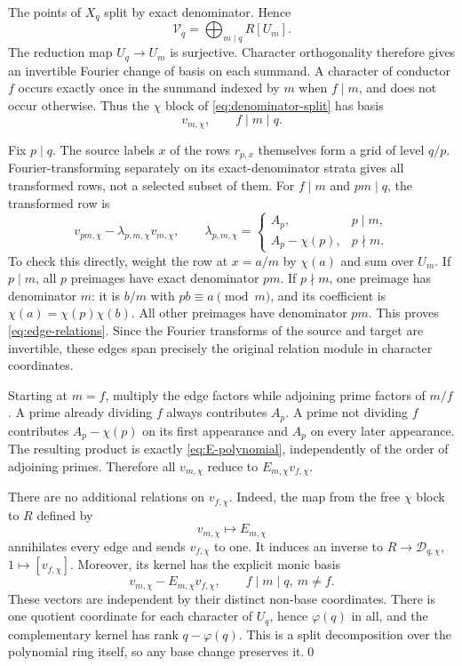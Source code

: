 \documentclass[11pt]{article}
\numberwithin{equation}{section}
\theoremstyle{definition}
\theoremstyle{remark}
\newcommand{\V}{\mathcal V}
\newcommand{\D}{\mathcal D}
\begin{document}
The points of $X_q$ split by exact denominator. Hence
\begin{equation}\label{eq:denominator-split}
 \V_q=\bigoplus_{m\mid q}R[U_m].
\end{equation}
The reduction map $U_q\to U_m$ is surjective. Character orthogonality
therefore gives an invertible Fourier change of basis on each summand.
A character of conductor $f$ occurs exactly once in the summand indexed
by $m$ when $f\mid m$, and does not occur otherwise. Thus the $\chi$
block of \eqref{eq:denominator-split} has basis
\[
 v_{m,\chi},\qquad f\mid m\mid q.
\]

Fix $p\mid q$. The source labels $x$ of the rows $r_{p,x}$ themselves
form a grid of level $q/p$. Fourier-transforming separately on its
exact-denominator strata gives all transformed rows, not a selected
subset of them. For $f\mid m$ and $pm\mid q$, the transformed row is
\begin{equation}\label{eq:edge-relations}
 v_{pm,\chi}-\lambda_{p,m,\chi}v_{m,\chi},
 \qquad
 \lambda_{p,m,\chi}=
 \begin{cases}
 A_p,&p\mid m,\\
 A_p-\chi(p),&p\nmid m.
 \end{cases}
\end{equation}
To check this directly, weight the row at $x=a/m$ by $\chi(a)$ and sum
over $U_m$. If $p\mid m$, all $p$ preimages have exact denominator $pm$.
If $p\nmid m$, one preimage has denominator $m$: it is $b/m$ with
$pb\equiv a\pmod m$, and its coefficient is
$\chi(a)=\chi(p)\chi(b)$. All other preimages have denominator $pm$.
This proves \eqref{eq:edge-relations}. Since the Fourier transforms of
the source and target are invertible, these edges span precisely the
original relation module in character coordinates.

Starting at $m=f$, multiply the edge factors while adjoining prime
factors of $m/f$. A prime already dividing $f$ always contributes $A_p$.
A prime not dividing $f$ contributes $A_p-\chi(p)$ on its first
appearance and $A_p$ on every later appearance. The resulting product
is exactly \eqref{eq:E-polynomial}, independently of the order of
adjoining primes. Therefore all $v_{m,\chi}$ reduce to
$E_{m,\chi}v_{f,\chi}$.

There are no additional relations on $v_{f,\chi}$. Indeed, the map from
the free $\chi$ block to $R$ defined by
\[
 v_{m,\chi}\longmapsto E_{m,\chi}
\]
annihilates every edge and sends $v_{f,\chi}$ to one. It induces an
inverse to $R\to\D_{q,\chi}$, $1\mapsto[v_{f,\chi}]$. Moreover, its
kernel has the explicit monic basis
\begin{equation}\label{eq:monic-basis}
 v_{m,\chi}-E_{m,\chi}v_{f,\chi},\qquad
 f\mid m\mid q,\ m\ne f.
\end{equation}
These vectors are independent by their distinct non-base coordinates.
There is one quotient coordinate for each character of $U_q$, hence
$\varphi(q)$ in all, and the complementary kernel has rank
$q-\varphi(q)$. This is a split decomposition over the polynomial ring
itself, so any base change preserves it.\qed
\end{document}
